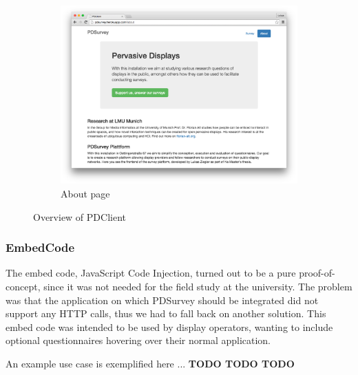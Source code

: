 \begin{figure}
		    \begin{subfigure}[b]{0.6\textwidth}
		        \centering
		        \includegraphics[width=\textwidth]{img/screenshots/pdclient/about}
		        \caption{About page}
		        \label{fig:4-pdclient-about}
		    \end{subfigure}
		    \caption{Overview of PDClient}
		    \label{fig:pdclient-screenshots}
		\end{figure}



	\subsubsection{EmbedCode}

		The embed code, JavaScript Code Injection, turned out to be a pure proof-of-concept, since it was not needed for the field study at the university. The problem was that the application on which PDSurvey should be integrated did not support any HTTP calls, thus we had to fall back on another solution. This embed code was intended to be used by display operators, wanting to include optional questionnaires hovering over their normal application. 


		An example use case is exemplified here ... \textbf{TODO TODO TODO}
		



